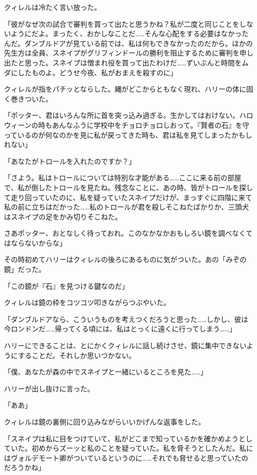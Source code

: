 \documentclass[10pt,a4paper]{article}
\begin{document}
\begin{CJK}{UTF8}{min}
クィレルは冷たく言い放った。

「彼がなぜ次の試合で審判を買って出たと思うかね？私が二度と同じことをしないようにだよ。まったく、おかしなことだ……そんな心配をする必要はなかったんだ。ダンブルドアが見ている前では、私は何もできなかったのだから。ほかの先生方は全員、スネイプがグリフィンドールの勝利を阻止するために審判を申し出たと思った。スネイプは憎まれ役を買って出たわけだ……ずいぶんと時間をムダにしたものよ。どうせ今夜、私がおまえを殺すのに」

クィレルが指をパチッとならした。縄がどこからともなく現れ、ハリーの体に固く巻きついた。

「ポッター、君はいろんな所に首を突っ込み過ぎる。生かしてはおけない。ハロウィーンの時もあんなふうに学校中をチョロチョロしおって。『賢者の石』を守っているのが何なのかを見に私が戻ってきた時も、君は私を見てしまったかもしれない」

「あなたがトロールを入れたのですか？」

「さよう。私はトロールについては特別な才能がある……ここに来る前の部屋で、私が倒したトロールを見たね。残念なことに、あの時、皆がトロールを探して走り回っていたのに、私を疑っていたスネイプだけが、まっすぐに四階に来て私の前に立ちはだかった……私のトロールが君を殺しそこねたばかりか、三頭犬はスネイプの足をかみ切りそこねた。

さあポッター、おとなしく待っておれ。このなかなかおもしろい鏡を調べなくてはならないからな」

その時初めてハリーはクィレルの後ろにあるものに気がついた。あの「みぞの鏡」だった。

「この鏡が『石』を見つける鍵なのだ」

クィレルは鏡の枠をコツコツ叩きながらつぶやいた。

「ダンブルドアなら、こういうものを考えつくだろうと思った……しかし、彼は今ロンドンだ……帰ってくる頃には、私はとっくに遠くに行ってしまう……」

ハリーにできることは、とにかくクィレルに話し続けさせ、鏡に集中できないようにすることだ。それしか思いつかない。

「僕、あなたが森の中でスネイプと一緒にいるところを見た……」

ハリーが出し抜けに言った。

「ああ」

クィレルは鏡の裏側に回り込みながらいいかげんな返事をした。

「スネイプは私に目をつけていて、私がどこまで知っているかを確かめようとしていた。初めからズーッと私のことを疑っていた。私を脅そうとしたんだ。私にはヴォルデモート卿がついているというのに……それでも脅せると思っていたのだろうかね」


\end{CJK}
\end{document}
